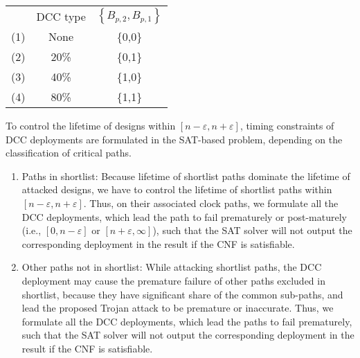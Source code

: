 {\small
\begin{tabular}{ c c c }
   & DCC type & $\left\{B_{p,2},B_{p,1}\right\}$ \\
  (1)\quad & None & \{0,0\} \\
  (2)\quad & 20\% &  \{0,1\} \\
  (3)\quad & 40\% &  \{1,0\} \\
  (4)\quad & 80\% &  \{1,1\} \\
\end{tabular}}

To control the lifetime of designs within $[n - \varepsilon, n + \varepsilon]$, timing constraints of DCC deployments are formulated in the SAT-based problem, depending on the classification of critical paths.
\begin{enumerate}[leftmargin=*]%
	\item Paths in shortlist: Because lifetime of shortlist paths dominate the lifetime of attacked designs, we have to control the lifetime of shortlist paths within $[n - \varepsilon, n + \varepsilon]$. Thus, on their associated clock paths, we formulate all the DCC deployments, which lead the path to fail prematurely or post-maturely (i.e., $[ 0, n - \varepsilon]$ or $[ n + \varepsilon, \infty]$), such that the SAT solver will not output the corresponding deployment in the result if the CNF is satisfiable.
	\item Other paths not in shortlist: While attacking shortlist paths, the DCC deployment may cause the premature failure of other paths excluded in shortlist, because they have significant share of the common sub-paths, and lead the proposed Trojan attack to be premature or inaccurate. %
	Thus, we formulate all the DCC deployments, which lead the paths to fail prematurely, such that the SAT solver will not output the corresponding deployment in the result if the CNF is satisfiable. 
\end{enumerate}

